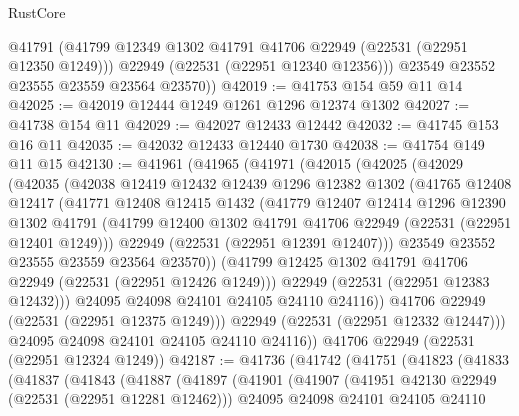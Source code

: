 \begin{lexlean}{RustCore}
\begin{coremodule}
          @41791
          (@41799 @12349 @1302 @41791 @41706 @22949 (@22531 (@22951 @12350 @1249)))
          @22949
          (@22531 (@22951 @12340 @12356)))
        @23549
        @23552
        @23555
        @23559
        @23564
        @23570))
@42019 := @41753 @154 @59 @11 @14
@42025 := @42019 @12444 @1249 @1261 @1296 @12374 @1302
@42027 := @41738 @154 @11
@42029 := @42027 @12433 @12442
@42032 := @41745 @153 @16 @11
@42035 := @42032 @12433 @12440 @1730
@42038 := @41754 @149 @11 @15
@42130 := @41961
    (@41965
      (@41971
        (@42015
          (@42025
            (@42029
              (@42035
                (@42038
                  @12419
                  @12432
                  @12439
                  @1296
                  @12382
                  @1302
                  (@41765
                    @12408
                    @12417
                    (@41771
                      @12408
                      @12415
                      @1432
                      (@41779
                        @12407
                        @12414
                        @1296
                        @12390
                        @1302
                        @41791
                        (@41799 @12400 @1302 @41791 @41706 @22949 (@22531 (@22951 @12401 @1249)))
                        @22949
                        (@22531 (@22951 @12391 @12407)))
                      @23549
                      @23552
                      @23555
                      @23559
                      @23564
                      @23570))
                  (@41799 @12425 @1302 @41791 @41706 @22949 (@22531 (@22951 @12426 @1249)))
                  @22949
                  (@22531 (@22951 @12383 @12432)))
                @24095
                @24098
                @24101
                @24105
                @24110
                @24116))
            @41706
            @22949
            (@22531 (@22951 @12375 @1249)))
          @22949
          (@22531 (@22951 @12332 @12447)))
        @24095
        @24098
        @24101
        @24105
        @24110
        @24116))
    @41706
    @22949
    (@22531 (@22951 @12324 @1249))
@42187 := @41736
    (@41742
      (@41751
        (@41823
          (@41833
            (@41837
              (@41843
                (@41887
                  (@41897
                    (@41901
                      (@41907
                        (@41951 @42130 @22949 (@22531 (@22951 @12281 @12462)))
                        @24095
                        @24098
                        @24101
                        @24105
                        @24110

\end{coremodule}
\end{lexlean}
